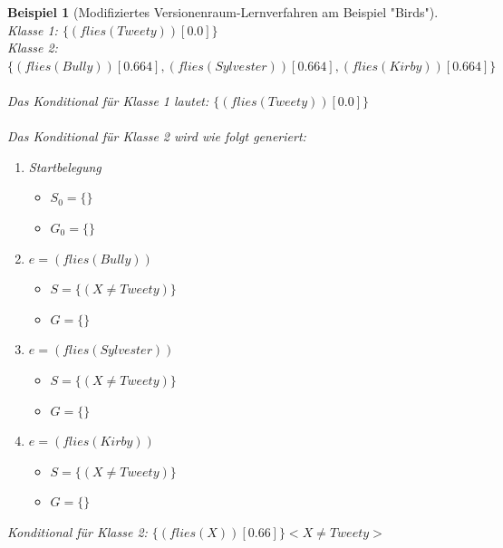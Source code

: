 \documentclass[a4paper, 11pt]{book}
\newtheorem{Bsp}{Beispiel}[section]
\begin{document}
\begin{Bsp}[Modifiziertes Versionenraum-Lernverfahren am Beispiel "{}Birds"{}]
\noindent
Klasse 1: $\{(flies(Tweety))[0.0]\}$\\
Klasse 2: $\{(flies(Bully))[0.664], (flies(Sylvester))[0.664], (flies(Kirby))[0.664]\}$\\
\\
Das Konditional für Klasse 1 lautet: $\{(flies(Tweety))[0.0]\}$\\
\\
Das Konditional für Klasse 2 wird wie folgt generiert:

\begin{enumerate}
	\item Startbelegung
	\begin{itemize}
		\item $ S_0 = \{\}$ 
		\item $ G_0 = \{\} $
	\end{itemize}
	\item $ e = (flies(Bully)) $
	\begin{itemize}
		\item $ S = \{(X \neq Tweety)\}$ 
		\item $ G = \{\} $
	\end{itemize}
	\item $ e = (flies(Sylvester)) $
	\begin{itemize}
		\item $ S = \{(X \neq Tweety)\}$ 
		\item $ G = \{\} $
	\end{itemize}
		\item $ e = (flies(Kirby)) $
	\begin{itemize}
		\item $ S = \{(X \neq Tweety)\}$ 
		\item $ G = \{\} $
	\end{itemize}	
\end{enumerate}
Konditional für Klasse 2: $\{(flies(X))[0.66]\} <X \neq Tweety>$\\
\end{Bsp}
\end{document}
